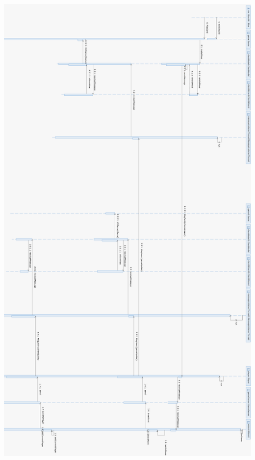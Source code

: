 \documentclass{article}
\begin{document}
\includegraphics[width=18cm, height = 26cm]{Entwurf_PlayCard2}\\
\newpage
\addtolength{\oddsidemargin}{3cm}
\end{document}
